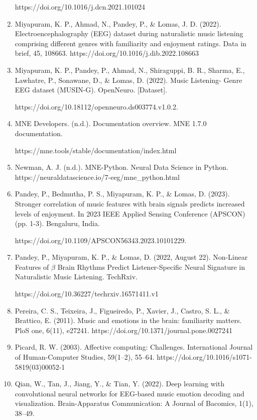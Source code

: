 \documentclass[fleqn,10pt]{SelfArx} %
\begin{document}
\begin{enumerate}
    https://doi.org/10.1016/j.dcn.2021.101024 
    \item Miyapuram, K. P., Ahmad, N., Pandey, P., \& Lomas, J. D. (2022). Electroencephalography (EEG) dataset during naturalistic music listening comprising different genres with familiarity and enjoyment ratings. Data in brief, 45, 108663. https://doi.org/10.1016/j.dib.2022.108663
    \item Miyapuram, K. P., Pandey, P., Ahmad, N., Shiraguppi, B. R., Sharma, E., Lawhatre, P., Sonawane, D., \& Lomas, D. (2022). Music Listening- Genre EEG dataset (MUSIN-G). OpenNeuro. [Dataset]. 
    
    https://doi.org/10.18112/openneuro.ds003774.v1.0.2.

    \item MNE Developers. (n.d.). Documentation overview. MNE 1.7.0 documentation. 
    
    https://mne.tools/stable/documentation/index.html 
    
    \item Newman, A. J. (n.d.). MNE-Python. Neural Data Science in Python. https://neuraldatascience.io/7-eeg/mne\_python.html

    \item Pandey, P., Bedmutha, P. S., Miyapuram, K. P., \& Lomas, D. (2023). Stronger correlation of music features with brain signals predicts increased levels of enjoyment. In 2023 IEEE Applied Sensing Conference (APSCON) (pp. 1-3). Bengaluru, India. 
    
    https://doi.org/10.1109/APSCON56343.2023.10101229.
    \item Pandey, P., Miyapuram, K. P., \& Lomas, D. (2022, August 22). Non-Linear Features of $\beta$ Brain Rhythms Predict Listener-Specific Neural Signature in Naturalistic Music Listening. TechRxiv. 
    
    https://doi.org/10.36227/techrxiv.16571411.v1
    
    \item Pereira, C. S., Teixeira, J., Figueiredo, P., Xavier, J., Castro, S. L., \& Brattico, E. (2011). Music and emotions in the brain: familiarity matters. PloS one, 6(11), e27241. https://doi.org/10.1371/journal.pone.0027241

    \item Picard, R. W. (2003). Affective computing: Challenges. International Journal of Human-Computer Studies, 59(1–2), 55–64. https://doi.org/10.1016/s1071-5819(03)00052-1 
    \item Qian, W., Tan, J., Jiang, Y., \& Tian, Y. (2022). Deep learning with convolutional neural networks for EEG-based music emotion decoding and visualization. Brain-Apparatus Communication: A Journal of Bacomics, 1(1), 38–49. 
    

\end{enumerate}
\end{document}
